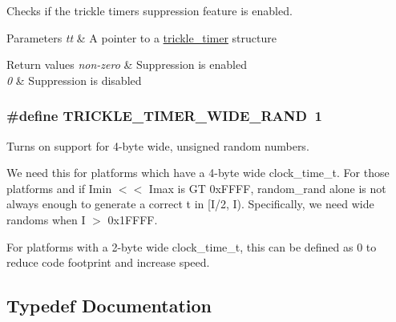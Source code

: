 Checks if the trickle timer\textquotesingle{}s suppression feature is enabled. 


\begin{DoxyParams}{Parameters}
{\em tt} & A pointer to a \hyperlink{structtrickle__timer}{trickle\+\_\+timer} structure\\
\hline
\end{DoxyParams}

\begin{DoxyRetVals}{Return values}
{\em non-\/zero} & Suppression is enabled \\
\hline
{\em 0} & Suppression is disabled \\
\hline
\end{DoxyRetVals}
\hypertarget{group__trickle-timer_ga2b3b9fd1a895243db18b35b7600bac15}{}
\subsubsection[{T\+R\+I\+C\+K\+L\+E\+\_\+\+T\+I\+M\+E\+R\+\_\+\+W\+I\+D\+E\+\_\+\+R\+A\+N\+D}]{\setlength{\rightskip}{0pt plus 5cm}\#define T\+R\+I\+C\+K\+L\+E\+\_\+\+T\+I\+M\+E\+R\+\_\+\+W\+I\+D\+E\+\_\+\+R\+A\+N\+D~1}\label{group__trickle-timer_ga2b3b9fd1a895243db18b35b7600bac15}


Turns on support for 4-\/byte wide, unsigned random numbers. 

We need this for platforms which have a 4-\/byte wide clock\+\_\+time\+\_\+t. For those platforms and if Imin $<$$<$ Imax is G\+T 0x\+F\+F\+F\+F, random\+\_\+rand alone is not always enough to generate a correct t in \mbox{[}I/2, I). Specifically, we need wide randoms when I $>$ 0x1\+F\+F\+F\+F.

For platforms with a 2-\/byte wide clock\+\_\+time\+\_\+t, this can be defined as 0 to reduce code footprint and increase speed. 

\subsection{Typedef Documentation}
\hypertarget{group__trickle-timer_ga243193848d28e6373682b8bd2e25850a}{}

